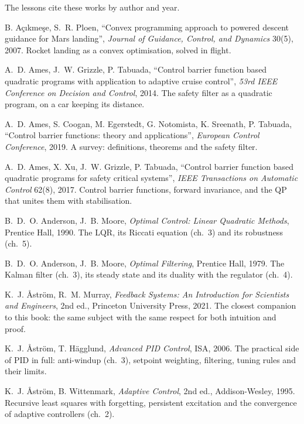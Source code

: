 \label{app:refs}

The lessons cite these works by author and year.

\begin{description}[leftmargin=1.5em, itemindent=-1.5em, itemsep=5pt, font=\normalfont]
  \item[] B. Açıkmeşe, S.~R. Ploen, \enquote{Convex programming approach to powered descent guidance for Mars landing}, \emph{Journal of Guidance, Control, and Dynamics} 30(5), 2007. Rocket landing as a convex optimisation, solved in flight.
  \item[] A.~D. Ames, J.~W. Grizzle, P. Tabuada, \enquote{Control barrier function based quadratic programs with application to adaptive cruise control}, \emph{53rd IEEE Conference on Decision and Control}, 2014. The safety filter as a quadratic program, on a car keeping its distance.
  \item[] A.~D. Ames, S. Coogan, M. Egerstedt, G. Notomista, K. Sreenath, P. Tabuada, \enquote{Control barrier functions: theory and applications}, \emph{European Control Conference}, 2019. A survey: definitions, theorems and the safety filter.
  \item[] A.~D. Ames, X. Xu, J.~W. Grizzle, P. Tabuada, \enquote{Control barrier function based quadratic programs for safety critical systems}, \emph{IEEE Transactions on Automatic Control} 62(8), 2017. Control barrier functions, forward invariance, and the QP that unites them with stabilisation.
  \item[] B.~D.~O. Anderson, J.~B. Moore, \emph{Optimal Control: Linear Quadratic Methods}, Prentice Hall, 1990. The LQR, its Riccati equation (ch.~3) and its robustness (ch.~5).
  \item[] B.~D.~O. Anderson, J.~B. Moore, \emph{Optimal Filtering}, Prentice Hall, 1979. The Kalman filter (ch.~3), its steady state and its duality with the regulator (ch.~4).
  \item[] K.~J. Åström, R.~M. Murray, \emph{Feedback Systems: An Introduction for Scientists and Engineers}, 2nd ed., Princeton University Press, 2021. The closest companion to this book: the same subject with the same respect for both intuition and proof.
  \item[] K.~J. Åström, T. Hägglund, \emph{Advanced PID Control}, ISA, 2006. The practical side of PID in full: anti-windup (ch.~3), setpoint weighting, filtering, tuning rules and their limits.
  \item[] K.~J. Åström, B. Wittenmark, \emph{Adaptive Control}, 2nd ed., Addison-Wesley, 1995. Recursive least squares with forgetting, persistent excitation and the convergence of adaptive controllers (ch.~2).

\end{description}
